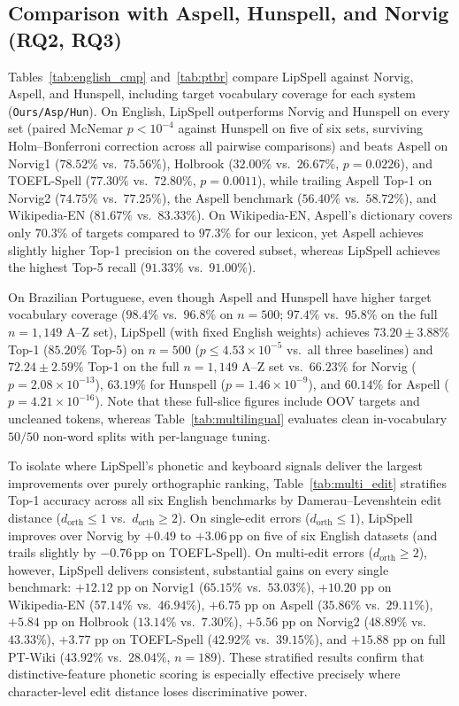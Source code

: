 \documentclass[11pt,a4paper]{article}
\begin{document}
\subsection{Comparison with Aspell, Hunspell, and Norvig (RQ2, RQ3)}
Tables~\ref{tab:english_cmp} and~\ref{tab:ptbr} compare LipSpell against Norvig, Aspell, and Hunspell, including target vocabulary coverage for each system (\texttt{Ours/Asp/Hun}). On English, LipSpell outperforms Norvig and Hunspell on every set (paired McNemar $p < 10^{-4}$ against Hunspell on five of six sets, surviving Holm--Bonferroni correction \citep{holm1979simple} across all pairwise comparisons) and beats Aspell on Norvig1 ($78.52\%$ vs.\ $75.56\%$), Holbrook ($32.00\%$ vs.\ $26.67\%$, $p=0.0226$), and TOEFL-Spell ($77.30\%$ vs.\ $72.80\%$, $p=0.0011$), while trailing Aspell Top-1 on Norvig2 ($74.75\%$ vs.\ $77.25\%$), the Aspell benchmark ($56.40\%$ vs.\ $58.72\%$), and Wikipedia-EN ($81.67\%$ vs.\ $83.33\%$). On Wikipedia-EN, Aspell's dictionary covers only $70.3\%$ of targets compared to $97.3\%$ for our lexicon, yet Aspell achieves slightly higher Top-1 precision on the covered subset, whereas LipSpell achieves the highest Top-5 recall ($91.33\%$ vs.\ $91.00\%$).

On Brazilian Portuguese, even though Aspell and Hunspell have higher target vocabulary coverage ($98.4\%$ vs.\ $96.8\%$ on $n=500$; $97.4\%$ vs.\ $95.8\%$ on the full $n=1{,}149$ A--Z set), LipSpell (with fixed English weights) achieves $73.20\pm3.88\%$ Top-1 ($85.20\%$ Top-5) on $n=500$ ($p \le 4.53\times 10^{-5}$ vs.\ all three baselines) and $72.24\pm2.59\%$ Top-1 on the full $n=1{,}149$ A--Z set vs.\ $66.23\%$ for Norvig ($p=2.08\times 10^{-13}$), $63.19\%$ for Hunspell ($p=1.46\times 10^{-9}$), and $60.14\%$ for Aspell ($p=4.21\times 10^{-16}$). Note that these full-slice figures include OOV targets and uncleaned tokens, whereas Table~\ref{tab:multilingual} evaluates clean in-vocabulary $50/50$ non-word splits with per-language tuning.

To isolate where LipSpell's phonetic and keyboard signals deliver the largest improvements over purely orthographic ranking, Table~\ref{tab:multi_edit} stratifies Top-1 accuracy across all six English benchmarks by Damerau--Levenshtein edit distance ($d_{\text{orth}} \le 1$ vs.\ $d_{\text{orth}} \ge 2$). On single-edit errors ($d_{\text{orth}} \le 1$), LipSpell improves over Norvig by $+0.49$ to $+3.06$\,pp on five of six English datasets (and trails slightly by $-0.76$\,pp on TOEFL-Spell). On multi-edit errors ($d_{\text{orth}} \ge 2$), however, LipSpell delivers consistent, substantial gains on every single benchmark: $+12.12$ pp on Norvig1 ($65.15\%$ vs.\ $53.03\%$), $+10.20$ pp on Wikipedia-EN ($57.14\%$ vs.\ $46.94\%$), $+6.75$ pp on Aspell ($35.86\%$ vs.\ $29.11\%$), $+5.84$ pp on Holbrook ($13.14\%$ vs.\ $7.30\%$), $+5.56$ pp on Norvig2 ($48.89\%$ vs.\ $43.33\%$), $+3.77$ pp on TOEFL-Spell ($42.92\%$ vs.\ $39.15\%$), and $+15.88$ pp on full PT-Wiki ($43.92\%$ vs.\ $28.04\%$, $n=189$). These stratified results confirm that distinctive-feature phonetic scoring is especially effective precisely where character-level edit distance loses discriminative power.
\end{document}
